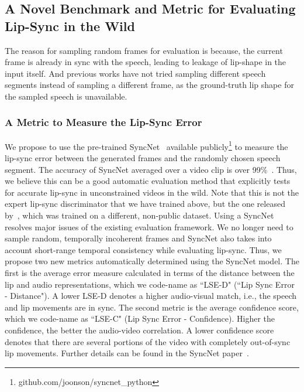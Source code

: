 \documentclass[sigconf]{acmart}
\begin{document}
\subsection{A Novel Benchmark and Metric for Evaluating Lip-Sync in the Wild}

The reason for sampling random frames for evaluation is because, the current frame is already in sync with the speech, leading to leakage of lip-shape in the input itself. And previous works have not tried sampling different speech segments instead of sampling a different frame, as the ground-truth lip shape for the sampled speech is unavailable. 

\subsubsection{A Metric to Measure the Lip-Sync Error}
We propose to use the pre-trained SyncNet~\cite{Chung16a} available publicly\footnote{github.com/joonson/syncnet\_python} to measure the lip-sync error between the generated frames and the randomly chosen speech segment. The accuracy of SyncNet averaged over a video clip is over 99\%~\cite{Chung16a}. Thus, we believe this can be a good automatic evaluation method that explicitly tests for accurate lip-sync in unconstrained videos in the wild. Note that this is not the expert lip-sync discriminator that we have trained above, but the one released by~\citet{Chung16a}, which was trained on a different, non-public dataset. Using a SyncNet resolves major issues of the existing evaluation framework. We no longer need to sample random, temporally incoherent frames and SyncNet also takes into account short-range temporal consistency while evaluating lip-sync. Thus, we propose two new metrics automatically determined using the SyncNet model. The first is the average error measure calculated in terms of the distance between the lip and audio representations, which we code-name as ``LSE-D" (``Lip Sync Error - Distance"). A lower LSE-D denotes a higher audio-visual match, i.e., the speech and lip movements are in sync. The second metric is the average confidence score, which we code-name as ``LSE-C" (Lip Sync Error - Confidence). Higher the confidence, the better the audio-video correlation. A lower confidence score denotes that there are several portions of the video with completely out-of-sync lip movements. Further details can be found in the SyncNet paper~\cite{Chung16a}.
\end{document}
